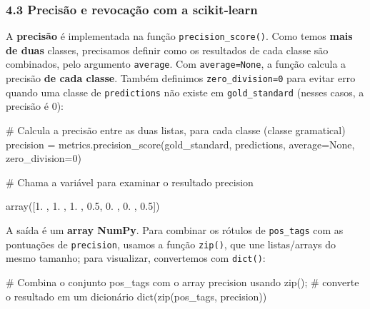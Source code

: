 \documentclass[
  brazilian,
  11pt,
]{article}
\newenvironment{Shaded}{\begin{snugshade}}{\end{snugshade}}
\newcommand{\BuiltInTok}[1]{\textcolor[rgb]{0.50,0.55,0.55}{#1}}
\newcommand{\CommentTok}[1]{\textcolor[rgb]{0.48,0.49,0.49}{#1}}
\newcommand{\DecValTok}[1]{\textcolor[rgb]{0.96,0.45,0.00}{#1}}
\newcommand{\NormalTok}[1]{\textcolor[rgb]{0.81,0.81,0.76}{#1}}
\newcommand{\OperatorTok}[1]{\textcolor[rgb]{0.81,0.81,0.76}{#1}}
\newcommand{\VariableTok}[1]{\textcolor[rgb]{0.15,0.68,0.68}{#1}}
\let\oldtexttt\texttt
\renewcommand{\texttt}[1]{{\color{inlink}\oldtexttt{#1}}}
\begin{document}
\subsubsection{4.3 Precisão e revocação com a
scikit‑learn}\label{precisuxe3o-e-revocauxe7uxe3o-com-a-scikitlearn}

A \textbf{precisão} é implementada na função
\texttt{precision\_score()}. Como temos \textbf{mais de duas} classes,
precisamos definir como os resultados de cada classe são combinados,
pelo argumento \texttt{average}. Com \texttt{average=None}, a função
calcula a precisão \textbf{de cada classe}. Também definimos
\texttt{zero\_division=0} para evitar erro quando uma classe de
\texttt{predictions} não existe em \texttt{gold\_standard} (nesses
casos, a precisão é 0):

\begin{Shaded}
\begin{Highlighting}[]
\CommentTok{\# Calcula a precisão entre as duas listas, para cada classe (classe gramatical)}
\NormalTok{precision }\OperatorTok{=}\NormalTok{ metrics.precision\_score(gold\_standard, predictions, average}\OperatorTok{=}\VariableTok{None}\NormalTok{, zero\_division}\OperatorTok{=}\DecValTok{0}\NormalTok{)}

\CommentTok{\# Chama a variável para examinar o resultado}
\NormalTok{precision}
\end{Highlighting}
\end{Shaded}

\begin{Shaded}
\begin{Highlighting}[]
\NormalTok{array([1. , 1. , 1. , 0.5, 0. , 0. , 0.5])}
\end{Highlighting}
\end{Shaded}

A saída é um \textbf{array NumPy}. Para combinar os rótulos de
\texttt{pos\_tags} com as pontuações de \texttt{precision}, usamos a
função \texttt{zip()}, que une listas/arrays do mesmo tamanho; para
visualizar, convertemos com \texttt{dict()}:

\begin{Shaded}
\begin{Highlighting}[]
\CommentTok{\# Combina o conjunto \textquotesingle{}pos\_tags\textquotesingle{} com o array \textquotesingle{}precision\textquotesingle{} usando zip();}
\CommentTok{\# converte o resultado em um dicionário}
\BuiltInTok{dict}\NormalTok{(}\BuiltInTok{zip}\NormalTok{(pos\_tags, precision))}
\end{Highlighting}
\end{Shaded}
\end{document}
